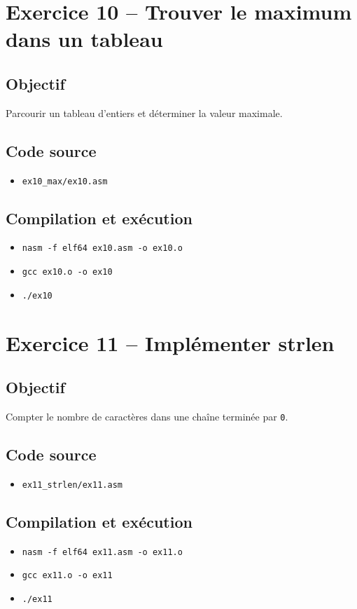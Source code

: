 \documentclass[11pt]{article}
\begin{document}
\section{Exercice 10 -- Trouver le maximum dans un tableau}
\subsection*{Objectif}
Parcourir un tableau d'entiers et déterminer la valeur maximale.

\subsection*{Code source}
\begin{itemize}[noitemsep]
    \item \texttt{ex10\_max/ex10.asm}
\end{itemize}

\subsection*{Compilation et exécution}
\begin{itemize}[noitemsep]
    \item \texttt{nasm -f elf64 ex10.asm -o ex10.o}
    \item \texttt{gcc ex10.o -o ex10}
    \item \texttt{./ex10}
\end{itemize}

\section{Exercice 11 -- Implémenter strlen}
\subsection*{Objectif}
Compter le nombre de caractères dans une chaîne terminée par \texttt{0}.

\subsection*{Code source}
\begin{itemize}[noitemsep]
    \item \texttt{ex11\_strlen/ex11.asm}
\end{itemize}

\subsection*{Compilation et exécution}
\begin{itemize}[noitemsep]
    \item \texttt{nasm -f elf64 ex11.asm -o ex11.o}
    \item \texttt{gcc ex11.o -o ex11}
    \item \texttt{./ex11}
\end{itemize}
\end{document}

